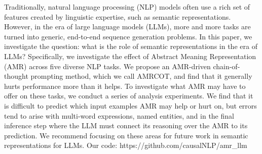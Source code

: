 Traditionally, natural language processing (NLP) models often use a rich set of features created by linguistic expertise, such as semantic representations. However, in the era of large language models (LLMs), more and more tasks are turned into generic, end-to-end sequence generation problems. In this paper, we investigate the question: what is the role of semantic representations in the era of LLMs? Specifically, we investigate the effect of Abstract Meaning Representation (AMR) across five diverse NLP tasks. We propose an AMR-driven chain-of-thought prompting method, which we call AMRCOT, and find that it generally hurts performance more than it helps. To investigate what AMR may have to offer on these tasks, we conduct a series of analysis experiments. We find that it is difficult to predict which input examples AMR may help or hurt on, but errors tend to arise with multi-word expressions, named entities, and in the final inference step where the LLM must connect its reasoning over the AMR to its prediction. We recommend focusing on these areas for future work in semantic representations for LLMs. Our code: https://github.com/causalNLP/amr\_llm